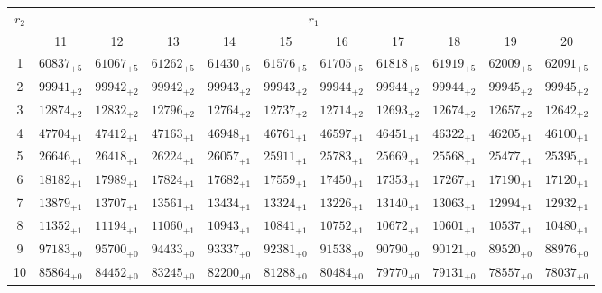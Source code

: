 \documentclass[10pt, a4paper]{article}
\begin{document}
\begin{center}
\begin{tabular}{c || c c c c c | c c c c c}
        \multirow{2}{*}{\(r_2\)} & \multicolumn{10}{c}{\(r_1\)} \\
        & 11 & 12 & 13 & 14 & 15 & 16 & 17 & 18 & 19 & 20\\
        \hline\hline
        1 & \({60837}_{+5}\) & \({61067}_{+5}\) & \({61262}_{+5}\) & \({61430}_{+5}\) & \({61576}_{+5}\) & \({61705}_{+5}\) & \({61818}_{+5}\) & \({61919}_{+5}\) & \({62009}_{+5}\) & \({62091}_{+5}\)\\
        2 & \({99941}_{+2}\) & \({99942}_{+2}\) & \({99942}_{+2}\) & \({99943}_{+2}\) & \({99943}_{+2}\) & \({99944}_{+2}\) & \({99944}_{+2}\) & \({99944}_{+2}\) & \({99945}_{+2}\) & \({99945}_{+2}\)\\
        3 & \({12874}_{+2}\) & \({12832}_{+2}\) & \({12796}_{+2}\) & \({12764}_{+2}\) & \({12737}_{+2}\) & \({12714}_{+2}\) & \({12693}_{+2}\) & \({12674}_{+2}\) & \({12657}_{+2}\) & \({12642}_{+2}\)\\
        4 & \({47704}_{+1}\) & \({47412}_{+1}\) & \({47163}_{+1}\) & \({46948}_{+1}\) & \({46761}_{+1}\) & \({46597}_{+1}\) & \({46451}_{+1}\) & \({46322}_{+1}\) & \({46205}_{+1}\) & \({46100}_{+1}\)\\
        5 & \({26646}_{+1}\) & \({26418}_{+1}\) & \({26224}_{+1}\) & \({26057}_{+1}\) & \({25911}_{+1}\) & \({25783}_{+1}\) & \({25669}_{+1}\) & \({25568}_{+1}\) & \({25477}_{+1}\) & \({25395}_{+1}\)\\
        \hline
        6 & \({18182}_{+1}\) & \({17989}_{+1}\) & \({17824}_{+1}\) & \({17682}_{+1}\) & \({17559}_{+1}\) & \({17450}_{+1}\) & \({17353}_{+1}\) & \({17267}_{+1}\) & \({17190}_{+1}\) & \({17120}_{+1}\)\\
        7 & \({13879}_{+1}\) & \({13707}_{+1}\) & \({13561}_{+1}\) & \({13434}_{+1}\) & \({13324}_{+1}\) & \({13226}_{+1}\) & \({13140}_{+1}\) & \({13063}_{+1}\) & \({12994}_{+1}\) & \({12932}_{+1}\)\\
        8 & \({11352}_{+1}\) & \({11194}_{+1}\) & \({11060}_{+1}\) & \({10943}_{+1}\) & \({10841}_{+1}\) & \({10752}_{+1}\) & \({10672}_{+1}\) & \({10601}_{+1}\) & \({10537}_{+1}\) & \({10480}_{+1}\)\\
        9 & \({97183}_{+0}\) & \({95700}_{+0}\) & \({94433}_{+0}\) & \({93337}_{+0}\) & \({92381}_{+0}\) & \({91538}_{+0}\) & \({90790}_{+0}\) & \({90121}_{+0}\) & \({89520}_{+0}\) & \({88976}_{+0}\)\\
        10 & \({85864}_{+0}\) & \({84452}_{+0}\) & \({83245}_{+0}\) & \({82200}_{+0}\) & \({81288}_{+0}\) & \({80484}_{+0}\) & \({79770}_{+0}\) & \({79131}_{+0}\) & \({78557}_{+0}\) & \({78037}_{+0}\)\\

\end{tabular}
\end{center}
\end{document}

